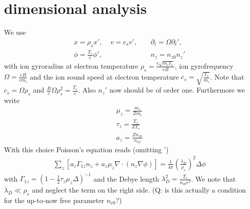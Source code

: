 \documentclass[a4paper,12pt]{scrartcl}
\begin{document}
\section{dimensional analysis}
We use 
\begin{subequations}
    \begin{align}
        x = \rho_s x', \ \ \ \ \  v = c_s v', \ \ \ \ \ 
            &\partial_t = \Omega \partial_t', \\
        \phi = \frac{T_e}{e}\phi',\ \ \ \ \
        &n_z  = n_{z0} n_z'%
        \label{}
    \end{align}
    \label{}
\end{subequations}with 
 ion gyroradius at electron temperature $\rho_s = \frac{c\sqrt{m_i T_e}}{eB}$,
 ion gyrofrequency $\Omega = \frac{eB}{cm_i}$ and
the ion sound speed at electron temperature $c_s = \sqrt{\frac{T_e}{m_i}}$. 
Note that $c_s = \Omega \rho_s$
and $\frac{B}{c}\Omega \rho_s^2 = \frac{T_e}{e}$.
Also $n_z'$ now should be of order one. 
Furthermore we write
\begin{subequations}
    \begin{align}
        \mu_z = \frac{m_z}{Zm_i}\\
        \tau_z = \frac{T_z}{ZT_e} \\
        a_z = \frac{Zn_{z0}}{n_{e0}}
        \label{}
    \end{align}
    \label{}
\end{subequations}
With this choice Poisson's equation reads (omitting ')
\begin{align}
    \sum_z \left[ a_z \Gamma_{1z}n_z + a_z\mu_z\nabla\cdot(n_z \nabla\phi)\right] = \frac{1}{4\pi}\left(  \frac{\lambda_D}{\rho_s} \right)^2 \Delta \phi 
    \label{}
\end{align}
with $\Gamma_{1z} = \left(1-\frac{1}{2}\tau_z\mu_z \Delta\right)^{-1}$ and the 
Debye length $\lambda_D^2 = \frac{T_e}{n_{e0}e^2}$. We note 
that $\lambda_D \ll \rho_s$ and neglect the term on the right side. (Q: is this
actually a condition for the up-to-now free parameter $n_{e0}$?)
\end{document}
